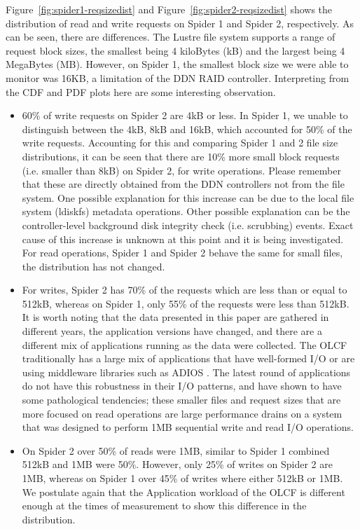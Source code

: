Figure~\ref{fig:spider1-reqsizedist} and Figure~\ref{fig:spider2-reqsizedist}
shows the distribution of read and write requests on Spider 1 and Spider 2,
respectively. As can be seen, there are differences. The Lustre file system
supports a range of request block sizes, the smallest being 4 kiloBytes (kB)
and the largest being 4 MegaBytes (MB).  However, on Spider 1, the smallest
block size we were able to monitor was 16KB, a limitation of the DDN RAID
controller. Interpreting from the CDF and PDF plots here are some interesting
observation.

\begin{itemize}

\item  60\% of write requests on Spider 2 are 4kB or less.  In Spider 1, we
unable to distinguish between the 4kB, 8kB and 16kB, which accounted for 50\%
of the write requests. Accounting for this and comparing Spider 1 and 2 file
size distributions, it can be seen that there are 10\% more small block requests (i.e.
smaller than 8kB) on Spider 2, for write operations. Please remember that these
are directly obtained from the DDN controllers not from the file system. One
possible explanation for this increase can be due to the local file system
(ldiskfs) metadata operations. Other possible explanation can be the
controller-level background disk integrity check (i.e. scrubbing) events. Exact
cause of this increase is unknown at this point and it is being investigated.
For read operations, Spider 1 and Spider 2 behave the same for small files, the
distribution has not changed.

\item  For writes, Spider 2 has 70\% of the requests which are less than or
equal to 512kB, whereas on Spider 1, only 55\% of the requests were less than
512kB. It is worth noting that the data presented in this paper are gathered in 
different years, the application versions have changed, and there are a different
mix of applications running as the data were collected. The OLCF traditionally has 
a large mix of applications that have well-formed I/O or are using middleware 
libraries such as ADIOS \cite{adios}. The latest round of applications do not have 
this robustness in their I/O patterns, and have shown to have some pathological 
tendencies; these smaller files and request sizes that are more focused on read 
operations are large performance drains on a system that was designed to perform 
1MB sequential write and read I/O operations. 

\item On Spider 2 over 50\% of reads were 1MB, similar to Spider 1 combined
512kB and 1MB were 50\%. However, only 25\% of writes on Spider 2 are 1MB,
whereas on Spider 1 over 45\% of writes where either 512kB or 1MB. We postulate 
again that the Application workload of the OLCF is different enough at the times of 
measurement to show this difference in the distribution.


\end{itemize}
